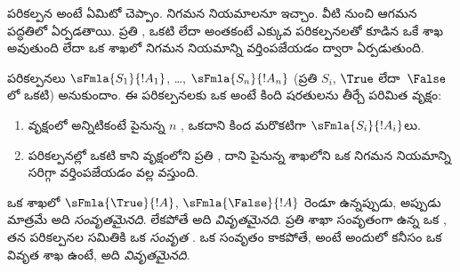 \documentclass[../../../include/open-logic-section]{subfiles}
\begin{document}
      {}
      {}


\begin{explain}
పరికల్పన అంటే ఏమిటో చెప్పాం. నిగమన నియమాలనూ ఇచ్చాం. 
వీటి నుంచి ఆగమన పద్ధతిలో ఏర్పడతాయి. ప్రతి , ఒకటి
లేదా అంతకంటే ఎక్కువ పరికల్పనలతో కూడిన ఒకే శాఖ అవుతుంది లేదా
ఒక  శాఖలో నిగమన నియమాన్ని వర్తింపజేయడం ద్వారా ఏర్పడుతుంది.
\end{explain}

\begin{defn}
పరికల్పనలు $\sFmla{S_1}{!A_1}$, \dots,
$\sFmla{S_n}{!A_n}$ (ప్రతి $S_i$, $\True$ లేదా~$\False$లో ఒకటి) అనుకుందాం.
ఈ పరికల్పనలకు ఒక  అంటే కింది షరతులను తీర్చే 
పరిమిత వృక్షం:
\begin{enumerate}
\item వృక్షంలో అన్నిటికంటే పైనున్న $n$ ,
  ఒకదాని కింద మరొకటిగా $\sFmla{S_i}{!A_i}$లు.
\item పరికల్పనల్లో ఒకటి కాని వృక్షంలోని ప్రతి ,
  దాని పైనున్న శాఖలోని ఒక  నిగమన నియమాన్ని
  సరిగ్గా వర్తింపజేయడం వల్ల వస్తుంది.
\end{enumerate}
ఒక  శాఖలో $\sFmla{\True}{!A}$,
$\sFmla{\False}{!A}$ రెండూ ఉన్నప్పుడు, అప్పుడు మాత్రమే అది
\emph{సంవృతమైనది}. లేకపోతే అది \emph{వివృతమైనది}. ప్రతి శాఖా
సంవృతంగా ఉన్న ఒక , తన పరికల్పనల సమితికి ఒక
\emph{సంవృత }. ఒక  సంవృతం కాకపోతే, అంటే
అందులో కనీసం ఒక వివృత శాఖ ఉంటే, అది \emph{వివృతమైనది}.
\end{defn}
\end{document}
